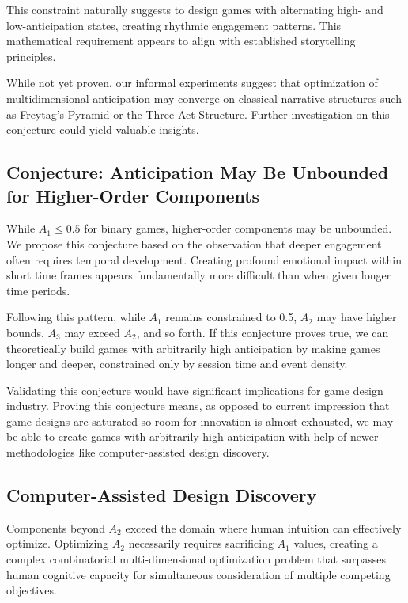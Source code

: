 \documentclass{article}
\begin{document}
This constraint naturally suggests to design games with alternating high- and low-anticipation states, creating rhythmic engagement patterns.
This mathematical requirement appears to align with established storytelling principles.

While not yet proven, our informal experiments suggest that optimization of multidimensional anticipation may converge on classical narrative structures such as Freytag's Pyramid or the Three-Act Structure.
Further investigation on this conjecture could yield valuable insights.

\subsection{Conjecture: Anticipation May Be Unbounded for Higher-Order Components}

While $A_1 \leq 0.5$ for binary games, higher-order components may be unbounded. We propose this conjecture based on the observation that deeper engagement often requires temporal development.
Creating profound emotional impact within short time frames appears fundamentally more difficult than when given longer time periods.

Following this pattern, while $A_1$ remains constrained to 0.5, $A_2$ may have higher bounds, $A_3$ may exceed $A_2$, and so forth. If this conjecture proves true, we can theoretically build games with arbitrarily high anticipation by making games longer and deeper, constrained only by session time and event density.

Validating this conjecture would have significant implications for game design industry.
Proving this conjecture means, as opposed to current impression that game designs are saturated so room for innovation is almost exhausted, we may be able to create games with arbitrarily high anticipation with help of newer methodologies like computer-assisted design discovery.

\subsection{Computer-Assisted Design Discovery}

Components beyond $A_2$ exceed the domain where human intuition can effectively optimize. Optimizing $A_2$ necessarily requires sacrificing $A_1$ values, creating a complex combinatorial multi-dimensional optimization problem that surpasses human cognitive capacity for simultaneous consideration of multiple competing objectives.
\end{document}
